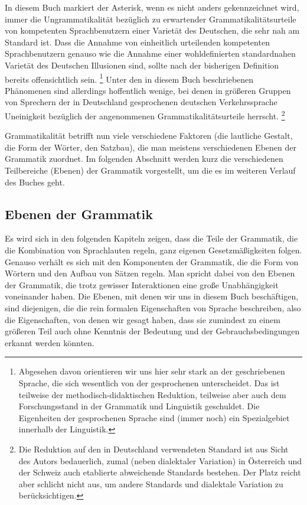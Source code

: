In diesem Buch markiert der Asterisk, wenn es nicht anders gekennzeichnet wird, immer die Ungrammatikalität bezüglich zu erwartender Grammatikalitätsurteile von kompetenten Sprachbenutzern einer Varietät des Deutschen, die sehr nah am Standard ist.
Dass die Annahme von einheitlich urteilenden kompetenten Sprachbenutzern genauso wie die Annahme einer wohldefinierten standardnahen Varietät des Deutschen Illusionen sind, sollte nach der bisherigen Definition bereits offensichtlich sein.%
\footnote{Abgesehen davon orientieren wir uns hier sehr stark an der geschriebenen Sprache, die sich wesentlich von der gesprochenen unterscheidet.
Das ist teilweise der methodisch-didaktischen Reduktion, teilweise aber auch dem Forschungsstand in der Grammatik und Linguistik geschuldet.
Die Eigenheiten der gesprochenen Sprache sind (immer noch) ein Spezialgebiet innerhalb der Linguistik.}
Unter den in diesem Buch beschriebenen Phänomenen sind allerdings hoffentlich wenige, bei denen in größeren Gruppen von Sprechern der in Deutschland gesprochenen deutschen Verkehrssprache Uneinigkeit bezüglich der angenommenen Grammatikalitätsurteile herrscht.%
\footnote{Die Reduktion auf den in Deutschland verwendeten Standard ist aus Sicht des Autors bedauerlich, zumal (neben dialektaler Variation) in Österreich und der Schweiz auch etablierte abweichende Standards bestehen.
Der Platz reicht aber schlicht nicht aus, um andere Standards und dialektale Variation zu berücksichtigen.}

Grammatikalität betrifft nun viele verschiedene Faktoren (\zB die lautliche Gestalt, die Form der Wörter, den Satzbau), die man meistens verschiedenen Ebenen der Grammatik zuordnet.
Im folgenden Abschnitt werden kurz die verschiedenen Teilbereiche (Ebenen) der Grammatik vorgestellt, um die es im weiteren Verlauf des Buches geht.

\subsection{Ebenen der Grammatik}

\label{sec:grebenen}


Es wird sich in den folgenden Kapiteln zeigen, dass die Teile der Grammatik, die \zB die Kombination von Sprachlauten regeln, ganz eigenen Gesetzmäßigkeiten folgen.
Genauso verhält es sich mit den Komponenten der Grammatik, die die Form von Wörtern und den Aufbau von Sätzen regeln.
Man spricht dabei von den Ebenen der Grammatik, die trotz gewisser Interaktionen eine große Unabhängigkeit voneinander haben.
Die Ebenen, mit denen wir uns in diesem Buch beschäftigen, sind diejenigen, die die rein formalen Eigenschaften von Sprache beschreiben, also die Eigenschaften, von denen wir gesagt haben, dass sie zumindest zu einem größeren Teil auch ohne Kenntnis der Bedeutung und der Gebrauchsbedingungen erkannt werden könnten.


